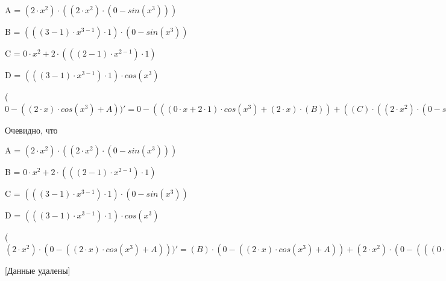 \documentclass[12pt,a4paper,fleqn]{article}
\begin{document}
\begin{center}
A = $(2 \cdot x^{2}) \cdot ((2 \cdot x^{2}) \cdot (0-sin(x^{3})))$\end{center}
\begin{center}
B = $(((3-1) \cdot x^{3-1}) \cdot 1) \cdot (0-sin(x^{3}))$\end{center}
\begin{center}
C = $0 \cdot x^{2}+2 \cdot (((2-1) \cdot x^{2-1}) \cdot 1)$\end{center}
\begin{center}
D = $(((3-1) \cdot x^{3-1}) \cdot 1) \cdot cos(x^{3})$\end{center}
\begin{center}
 ($0-((2 \cdot x) \cdot cos(x^{3})+A))'
  = 0-(((0 \cdot x+2 \cdot 1) \cdot cos(x^{3})+(2 \cdot x) \cdot (B))+((C) \cdot ((2 \cdot x^{2}) \cdot (0-sin(x^{3})))+(2 \cdot x^{2}) \cdot ((C) \cdot (0-sin(x^{3}))+(2 \cdot x^{2}) \cdot (0-D))))$\end{center}
Очевидно, что

\begin{center}
A = $(2 \cdot x^{2}) \cdot ((2 \cdot x^{2}) \cdot (0-sin(x^{3})))$\end{center}
\begin{center}
B = $0 \cdot x^{2}+2 \cdot (((2-1) \cdot x^{2-1}) \cdot 1)$\end{center}
\begin{center}
C = $(((3-1) \cdot x^{3-1}) \cdot 1) \cdot (0-sin(x^{3}))$\end{center}
\begin{center}
D = $(((3-1) \cdot x^{3-1}) \cdot 1) \cdot cos(x^{3})$\end{center}
\begin{center}
 ($(2 \cdot x^{2}) \cdot (0-((2 \cdot x) \cdot cos(x^{3})+A)))'
  = (B) \cdot (0-((2 \cdot x) \cdot cos(x^{3})+A))+(2 \cdot x^{2}) \cdot (0-(((0 \cdot x+2 \cdot 1) \cdot cos(x^{3})+(2 \cdot x) \cdot (C))+((B) \cdot ((2 \cdot x^{2}) \cdot (0-sin(x^{3})))+(2 \cdot x^{2}) \cdot ((B) \cdot (0-sin(x^{3}))+(2 \cdot x^{2}) \cdot (0-D)))))$\end{center}
[Данные удалены]
\end{document}
